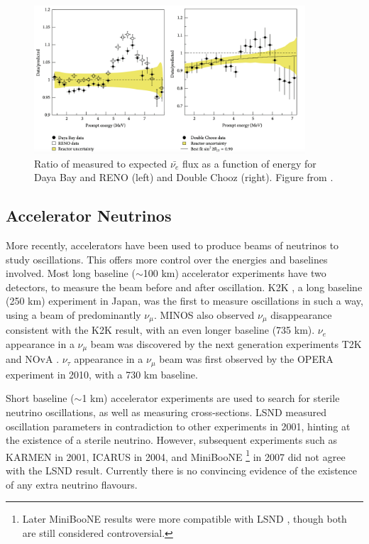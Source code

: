 \begin{figure}
\centering
\includegraphics*[width=0.9\textwidth,clip]{figs/sbanom}
\caption{Ratio of measured to expected $\bar{\nu_e}$ flux as a function of energy for Daya Bay and RENO (left) and Double Chooz (right). Figure from \cite{sbanom}.} \label{fig:sbanom}
\end{figure}

\subsection{Accelerator Neutrinos}\label{sec:acceleratorneutrinos}

More recently, accelerators have been used to produce beams of neutrinos to study oscillations. This offers more control over the energies and baselines involved. Most long baseline ($\sim$100 km) accelerator experiments have two detectors, to measure the beam before and after oscillation. K2K \cite{k2k}, a long baseline (250 km) experiment in Japan, was the first to measure oscillations in such a way, using a beam of predominantly $\nu_\mu$. MINOS \cite{minos} also observed $\nu_\mu$ disappearance consistent with the K2K result, with an even longer baseline (735 km). $\nu_e$ appearance in a $\nu_\mu$ beam was discovered by the next generation experiments T2K and NOvA \cite{nova}. $\nu_\tau$ appearance in a $\nu_\mu$ beam was first observed by the OPERA\cite{opera} experiment in 2010, with a 730 km baseline. 

Short baseline ($\sim$1 km) accelerator experiments are used to search for sterile neutrino oscillations, as well as measuring cross-sections. LSND \cite{lsnd} measured oscillation parameters in contradiction to other experiments in 2001, hinting at the existence of a sterile neutrino. However, subsequent experiments such as KARMEN \cite{karmen} in 2001, ICARUS \cite{icarus} in 2004, and MiniBooNE \cite{miniboone1}\footnote{Later MiniBooNE results were more compatible with LSND \cite{miniboone2}, though both are still considered controversial.} in 2007 did not agree with the LSND result. Currently there is no convincing evidence of the existence of any extra neutrino flavours.

